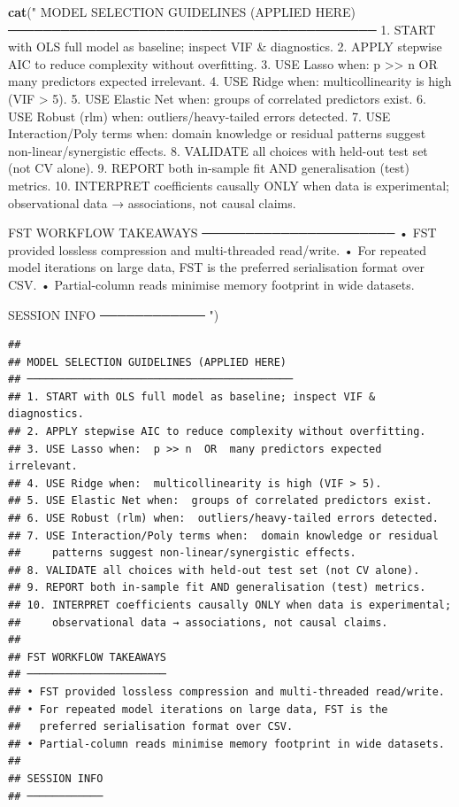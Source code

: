 \documentclass[
]{article}
\newenvironment{Shaded}{\begin{snugshade}}{\end{snugshade}}
\newcommand{\FunctionTok}[1]{\textcolor[rgb]{0.13,0.29,0.53}{\textbf{#1}}}
\newcommand{\NormalTok}[1]{#1}
\newcommand{\StringTok}[1]{\textcolor[rgb]{0.31,0.60,0.02}{#1}}
\begin{document}
\begin{Shaded}
\begin{Highlighting}[]
\FunctionTok{cat}\NormalTok{(}\StringTok{"}
\StringTok{MODEL SELECTION GUIDELINES (APPLIED HERE)}
\StringTok{──────────────────────────────────────────}
\StringTok{1. START with OLS full model as baseline; inspect VIF \& diagnostics.}
\StringTok{2. APPLY stepwise AIC to reduce complexity without overfitting.}
\StringTok{3. USE Lasso when:  p \textgreater{}\textgreater{} n  OR  many predictors expected irrelevant.}
\StringTok{4. USE Ridge when:  multicollinearity is high (VIF \textgreater{} 5).}
\StringTok{5. USE Elastic Net when:  groups of correlated predictors exist.}
\StringTok{6. USE Robust (rlm) when:  outliers/heavy{-}tailed errors detected.}
\StringTok{7. USE Interaction/Poly terms when:  domain knowledge or residual}
\StringTok{    patterns suggest non{-}linear/synergistic effects.}
\StringTok{8. VALIDATE all choices with held{-}out test set (not CV alone).}
\StringTok{9. REPORT both in{-}sample fit AND generalisation (test) metrics.}
\StringTok{10. INTERPRET coefficients causally ONLY when data is experimental;}
\StringTok{    observational data → associations, not causal claims.}

\StringTok{FST WORKFLOW TAKEAWAYS}
\StringTok{──────────────────────}
\StringTok{• FST provided lossless compression and multi{-}threaded read/write.}
\StringTok{• For repeated model iterations on large data, FST is the}
\StringTok{  preferred serialisation format over CSV.}
\StringTok{• Partial{-}column reads minimise memory footprint in wide datasets.}

\StringTok{SESSION INFO}
\StringTok{────────────}
\StringTok{"}\NormalTok{)}
\end{Highlighting}
\end{Shaded}

\begin{verbatim}
## 
## MODEL SELECTION GUIDELINES (APPLIED HERE)
## ──────────────────────────────────────────
## 1. START with OLS full model as baseline; inspect VIF & diagnostics.
## 2. APPLY stepwise AIC to reduce complexity without overfitting.
## 3. USE Lasso when:  p >> n  OR  many predictors expected irrelevant.
## 4. USE Ridge when:  multicollinearity is high (VIF > 5).
## 5. USE Elastic Net when:  groups of correlated predictors exist.
## 6. USE Robust (rlm) when:  outliers/heavy-tailed errors detected.
## 7. USE Interaction/Poly terms when:  domain knowledge or residual
##     patterns suggest non-linear/synergistic effects.
## 8. VALIDATE all choices with held-out test set (not CV alone).
## 9. REPORT both in-sample fit AND generalisation (test) metrics.
## 10. INTERPRET coefficients causally ONLY when data is experimental;
##     observational data → associations, not causal claims.
## 
## FST WORKFLOW TAKEAWAYS
## ──────────────────────
## • FST provided lossless compression and multi-threaded read/write.
## • For repeated model iterations on large data, FST is the
##   preferred serialisation format over CSV.
## • Partial-column reads minimise memory footprint in wide datasets.
## 
## SESSION INFO
## ────────────
\end{verbatim}
\end{document}
